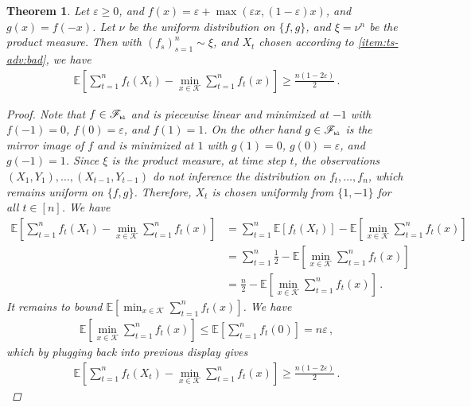 \documentclass[letter, 12pt]{report}
\newcommand{\pb}{\text{\tiny\texttt{b}}}
\newcommand{\pl}{\text{\tiny\texttt{l}}}
\newcommand{\E}{\mathbb E}
\newcommand{\cK}{\mathcal K}
\newcommand{\sF}{\mathscr F}
\newcommand{\1}{\mathbf{1}}
\renewcommand{\epsilon}{\varepsilon}
\theoremstyle{plain}
\newtheorem{theorem}{Theorem}
\theoremstyle{definition}
\theoremstyle{remark}
\begin{document}
\begin{theorem}
    Let $\epsilon \geq 0$, and $f(x) = \epsilon + \max(\epsilon x, (1-\epsilon)x)$,
    and $g(x) = f(-x)$.
    Let $\nu$ be the uniform distribution on $\{f, g\}$,
    and $\xi = \nu^n$ be the product measure.
    Then with $(f_s)_{s=1}^n \sim \xi$, and $X_t$ chosen according to \ref{item:ts-adv:bad},
    we have
    \begin{align*}
        \E\left[
            \sum_{t=1}^n f_t(X_t) - \min_{x \in \cK} \sum_{t=1}^n f_t(x)
            \right]
        \geq \frac{n (1 - 2\epsilon)}{2}\,.
    \end{align*}
    \begin{proof}
        Note that $f \in \sF_{\pb\pl}$ and is piecewise linear and minimized at $-1$ with $f(-1) = 0$, $f(0) = \epsilon$, and $f(1) = 1$.
        On the other hand $g \in \sF_{\pb\pl}$ is the mirror image of $f$ and is minimized at $1$ with $g(1) = 0$, $g(0) = \epsilon$, and $g(-1) = 1$.
        Since $\xi$ is the product measure, at time step $t$,
        the observations $(X_1, Y_1), \ldots, (X_{t-1}, Y_{t-1})$ do not inference the distribution on
        $f_t, \ldots, f_n$, which remains uniform on $\{f, g\}$.
        Therefore, $X_t$ is chosen uniformly from $\{1, -1\}$ for all $t \in [n]$.
        We have
        \begin{align*}
            \E\left[
                \sum_{t=1}^n f_t(X_t) - \min_{x \in \cK} \sum_{t=1}^n f_t(x)
                \right]
             & =
            \sum_{t=1}^n
            \E\left[
                f_t(X_t)\right]
            -
            \E\left[
                \min_{x \in \cK} \sum_{t=1}^n f_t(x)
                \right]
            \\
             & =
            \sum_{t=1}^n
            \frac{1}{2}
            -
            \E\left[
                \min_{x \in \cK} \sum_{t=1}^n f_t(x)
                \right]
            \\
             & =
            \frac{n}{2}
            -
            \E\left[
                \min_{x \in \cK} \sum_{t=1}^n f_t(x)
                \right]
            \,.
        \end{align*}
        It remains to bound $\E\left[
                \min_{x \in \cK} \sum_{t=1}^n f_t(x)
                \right]$.
        We have
        \begin{align*}
            \E\left[
                \min_{x \in \cK} \sum_{t=1}^n f_t(x)
                \right]
            \leq
            \E\left[
                \sum_{t=1}^n f_t(0)
                \right]
            =
            n \epsilon\,,
        \end{align*}
        which by plugging back into previous display gives
        \begin{align*}
            \E\left[
                \sum_{t=1}^n f_t(X_t) - \min_{x \in \cK} \sum_{t=1}^n f_t(x)
                \right]
            \geq \frac{n (1 - 2\epsilon)}{2}\,.
        \end{align*}
    \end{proof}
\end{theorem}
\end{document}
